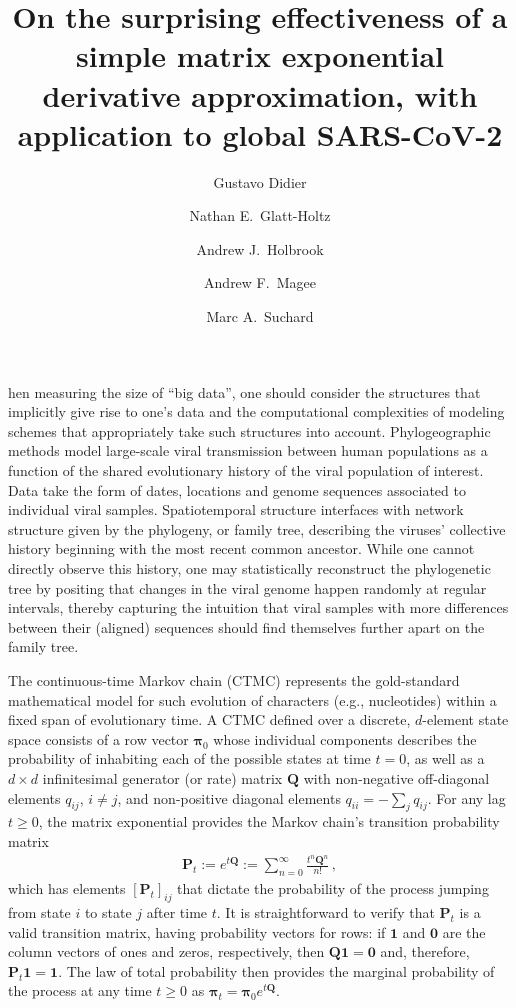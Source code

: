 \documentclass[9pt,twocolumn,twoside]{pnas-new}
\title{On the surprising effectiveness of a simple matrix exponential derivative approximation, with application to global SARS-CoV-2}
\author[a]{Gustavo Didier}
\author[a]{Nathan E.~Glatt-Holtz}
\author[b,1]{Andrew J.~Holbrook}
\author[b]{Andrew F.~Magee}
\author[b,c,d]{Marc A.~Suchard}
\affil[a]{Department of Mathematics, Tulane University}
\affil[b]{Department of Biostatistics, University of California, Los Angeles}
\affil[c]{Department of Biomathematics, University of California, Los Angeles}
\affil[d]{Department of Human Genetics, University of California, Los Angeles}
\newcommand{\?}{\textbf{?}}
\newcommand{\QQ}{\mathbf{Q}}
\newcommand{\Zero}{\boldsymbol{0}}
\newcommand{\ppi}{\boldsymbol{\pi}}
\renewcommand{\P}{\mathbf{P}}
\newcommand{\one}{\mathbf{1}}
\begin{document}
\maketitle
\thispagestyle{firststyle}




hen measuring the size of ``big data'', one should
consider the structures that implicitly give rise to one's data and
the computational complexities of modeling schemes that appropriately
take such structures into account. Phylogeographic methods
\cite{lemey2009bayesian, lemey2014unifying, holbrook2021massive,
  holbrook2022viral} model large-scale viral transmission between
human populations as a function of the shared evolutionary history of
the viral population of interest.  Data take the form of dates,
locations and genome sequences associated to individual viral
samples. Spatiotemporal structure interfaces with network structure
given by the phylogeny, or family tree, describing the viruses'
collective history beginning with the most recent common ancestor.
While one cannot directly observe this history, one may statistically
reconstruct the phylogenetic tree by positing that changes in the
viral genome happen randomly at regular intervals, thereby capturing
the intuition that viral samples with more differences between their
(aligned) sequences should find themselves further apart on the family
tree.

The continuous-time Markov chain (CTMC) \cite{norris1998markov}
represents the gold-standard mathematical model for such evolution of
characters (e.g., nucleotides) within a fixed span of evolutionary
time. A CTMC defined over a discrete, $d$-element state space consists
of a row vector $\ppi_0$ whose individual components describes the
probability of inhabiting each of the possible states at time $t=0$,
as well as a $d\times d$ infinitesimal generator (or rate) matrix
$\QQ$ with non-negative off-diagonal elements $q_{ij}$, $i\neq j$, and
non-positive diagonal elements $q_{ii}=-\sum_j q_{ij}$. For any lag
$t\geq 0$, the matrix exponential
\cite{moler1978nineteen,moler2003nineteen} provides the Markov chain's
transition probability matrix
\begin{align}
    \P_t := e^{t \QQ} := \sum_{n=0}^\infty \frac{t^n\QQ^n}{n!}  \, ,
\end{align}
which has elements $[\P_t]_{ij}$ that dictate the probability of the
process jumping from state $i$ to state $j$ after time $t$. It is
straightforward to verify that $\P_t$ is a valid transition matrix,
having probability vectors for rows: if $\one$ and $\Zero$ are the
column vectors of ones and zeros, respectively, then $\QQ\one=\Zero$
and, therefore, $\P_t\one=\one$. The law of total probability then
provides the marginal probability of the process at any time
$t \geq 0$ as $\ppi_t=\ppi_0 e^{t\QQ}$.
\end{document}
